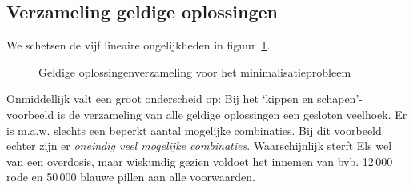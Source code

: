 \subsection{Verzameling geldige oplossingen}
We schetsen  de vijf lineaire ongelijkheden  in 
figuur~\ref{fig:minoplverz}. 
\begin{figure}[tbp]
    \centering
{}
    \caption{Geldige oplossingenverzameling voor het
    minimalisatieprobleem}
    \label{fig:minoplverz}
\end{figure}

Onmiddellijk valt een groot onderscheid op: Bij het `kippen en
schapen'-voorbeeld is de verzameling van alle geldige oplossingen
een gesloten veelhoek. Er is m.a.w. slechts een beperkt aantal
mogelijke combinaties. Bij dit voorbeeld echter zijn er \emph{oneindig
veel mogelijke combinaties}. Waarschijnlijk sterft Els wel van
een overdosis, maar wiskundig gezien voldoet het innemen van
bvb. 12\,000 rode en 50\,000 blauwe pillen aan alle voorwaarden.



